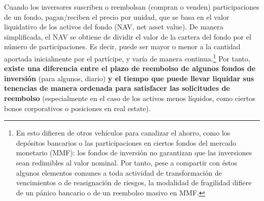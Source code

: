 \documentclass[10pt,a4paper]{article}
\begin{document}
Cuando los inversores suscriben o reembolsan (compran o venden) participaciones de un fondo, pagan/reciben el precio por unidad, que se basa en el valor liquidativo de los activos del fondo (NAV, net asset value). De manera simplificada, el NAV se obtiene de dividir el valor de la cartera del fondo por el número de participaciones. Es decir, puede ser mayor o menor a la cantidad aportada inicialmente por el partícipe, y varía de manera continua.\footnote{%
    En esto difieren de otros vehículos para canalizar el ahorro, como los depósitos bancarios o las participaciones en ciertos fondos del mercado monetario (MMF): los fondos de inversión no garantizan que las inversiones sean redimibles al valor nominal. Por tanto, pese a compartir con éstos algunos elementos comunes a toda actividad de transformación de vencimientos o de reasignación de riesgos, la modalidad de fragilidad difiere de un pánico bancario o de un reembolso masivo en MMF.
} Por tanto, \textbf{existe una diferencia entre el plazo de reembolso de algunos fondos de inversión} (para algunos, diario) \textbf{y el tiempo que puede llevar liquidar sus tenencias de manera ordenada para satisfacer las solicitudes de reembolso} (especialmente en el caso de los activos menos líquidos, como ciertos bonos corporativos o posiciones en real estate). 
\end{document}
